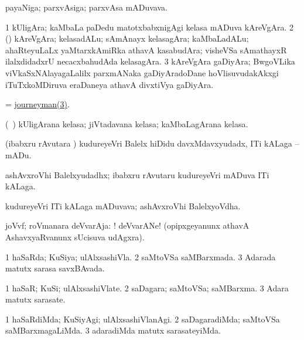 \bentry
{}
\gl{\nA}
\bmng
payaNiga; parxvAsiga; parxvAsa mADuvava. 
\emng
\eentry

\bentry
{}
\gl{\nA}
\bmng
\bnum
\num{1} kUligAra; kaMbaLa paDedu matotxbabxnigAgi kelasa mADuva kAreVgAra. 
\num{2} (\rUpa) kAreVgAra; kelasadALu; sAmAnayx kelasagAra; kaMbaLadALu; ahaRteyuLaLx yaMtarxkAmiRka athavA kasabudAra; visheVSa sAmathayxR ilalxdidadxrU necacxbahudAda kelasagAra. 
\hypertarget{journeyman(3)}{} 
\num{3} kAreVgAra gaDiyAra; BwgoVLika viVkaSxNAlayagaLalilx parxmANaka gaDiyAradoDane hoVlisuvudakAkxgi iTuTxkoMDiruva eraDaneya athavA divxtiVya gaDiyAra. 
\enum
\emng
\eentry

\bentry
{}
\gl{\nA}
\bmng
 = \hyperlink{journeyman(3)}{journeyman(3)}. 
\emng
\eentry

\bentry
{}
\gl{\nA}
\bmng
(\kanmu\ \rUpa) kUligArana kelasa; jiVtadavana kelasa; kaMbaLagArana kelasa. 
\emng
\eentry

\bentry
{}
\gl{\akirx}
\bmng
(ibabxru rAvutara \vi) kudureyeVri Balelx hiDidu davxMdavxyudadx, ITi kALaga -- mADu. 
\emng
\eentry

\bentry
{}
\gl{\nA}
\bmng
ashAvxroVhi Balelxyudadhx; ibabxru rAvutaru kudureyeVri mADuva ITi kALaga. 
\emng
\eentry

\bentry
{}
\gl{\nA}
\bmng
kudureyeVri ITi kALaga mADuvava; ashAvxroVhi BalelxyoVdha. 
\emng
\eentry

\bentry
{}
\gl{\nA}
\bmng
joVvf; roVmanara deVvarAja: ! deVvarANe! (opipxgeyanunx athavA AshavxyaRvanunx sUcisuva udAgxra). 
\emng
\eentry

\bentry
{}
\gl{\gu}
\bmng
\bnum
\num{1} haSaRda; KuSiya; ulAlxsashiVla. 
\num{2} saMtoVSa saMBarxmada. 
\num{3} Adarada matutx sarasa savxBAvada. 
\enum
\emng
\eentry

\bentry
{}
\gl{\nA}
\bmng
\bnum
\num{1} haSaR; KuSi; ulAlxsashiVlate. 
\num{2} saDagara; saMtoVSa; saMBarxma. 
\num{3} Adara matutx sarasate. 
\enum
\emng
\eentry

\bentry
{}
\gl{\kirxvi}
\bmng
\bnum
\num{1} haSaRdiMda; KuSiyAgi; ulAlxsashiVlanAgi. 
\num{2} saDagaradiMda; saMtoVSa saMBarxmagaLiMda. 
\num{3} adaradiMda matutx sarasateyiMda. 
\enum
\emng
\eentry

